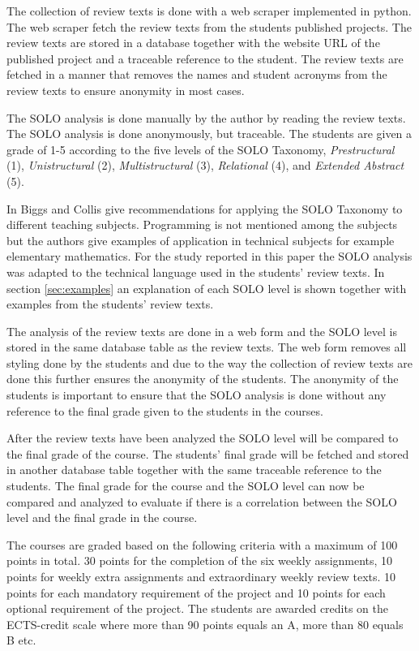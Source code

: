 \documentclass[twoside,twocolumn,a4paper,11pt,english]{article}
\begin{document}
The collection of review texts is done with a web scraper implemented in python. The web scraper fetch the review texts from the students published projects. The review texts are stored in a database together with the website URL of the published project and a traceable reference to the student. The review texts are fetched in a manner that removes the names and student acronyms from the review texts to ensure anonymity in most cases.

The SOLO analysis is done manually by the author by reading the review texts. The SOLO analysis is done anonymously, but traceable. The students are given a grade of 1-5 according to the five levels of the SOLO Taxonomy, \textit{Prestructural} (1), \textit{Unistructural} (2), \textit{Multistructural} (3), \textit{Relational} (4), and \textit{Extended Abstract} (5).

In \cite{biggs1982evaluation} Biggs and Collis give recommendations for applying the SOLO Taxonomy to different teaching subjects. Programming is not mentioned among the subjects but the authors give examples of application in technical subjects for example elementary mathematics. For the study reported in this paper the SOLO analysis was adapted to the technical language used in the students' review texts. In section \ref{sec:examples} an explanation of each SOLO level is shown together with examples from the students' review texts.

The analysis of the review texts are done in a web form and the SOLO level is stored in the same database table as the review texts. The web form removes all styling done by the students and due to the way the collection of review texts are done this further ensures the anonymity of the students. The anonymity of the students is important to ensure that the SOLO analysis is done without any reference to the final grade given to the students in the courses.

After the review texts have been analyzed the SOLO level will be compared to the final grade of the course. The students' final grade will be fetched and stored in another database table together with the same traceable reference to the students. The final grade for the course and the SOLO level can now be compared and analyzed to evaluate if there is a correlation between the SOLO level and the final grade in the course.

The courses are graded based on the following criteria with a maximum of 100 points in total. 30 points for the completion of the six weekly assignments, 10 points for weekly extra assignments and extraordinary weekly review texts. 10 points for each mandatory requirement of the project and 10 points for each optional requirement of the project. The students are awarded credits on the ECTS-credit scale where more than 90 points equals an A, more than 80 equals B etc.
\end{document}
